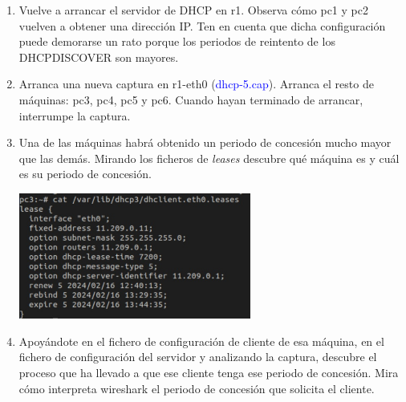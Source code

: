 \documentclass[12pt, a4paper]{report}
\begin{document}
\begin{enumerate}
	\item Vuelve a arrancar el servidor de DHCP en r1. Observa cómo pc1 y pc2 vuelven a obtener una dirección
	IP. Ten en cuenta que dicha configuración puede demorarse un rato porque los periodos de reintento de
	los DHCPDISCOVER son mayores.
	\item Arranca una nueva captura en r1-eth0 (\textcolor{blue}{dhcp-5.cap}). Arranca el resto de máquinas: pc3, pc4, pc5 y
	pc6. Cuando hayan terminado de arrancar, interrumpe la captura.
	\item Una de las máquinas habrá obtenido un periodo de concesión mucho mayor que las demás. Mirando los
	ficheros de \textit{leases} descubre qué máquina es y cuál es su periodo de concesión.\\
	\begin{center}
		\includegraphics[width=0.6\textwidth]{ej3_5}
	\end{center}
	\item Apoyándote en el fichero de configuración de cliente de esa máquina, en el fichero de configuración del
	servidor y analizando la captura, descubre el proceso que ha llevado a que ese cliente tenga ese periodo
	de concesión. Mira cómo interpreta wireshark el periodo de concesión que solicita el cliente.\\
	

\end{enumerate}
\end{document}
